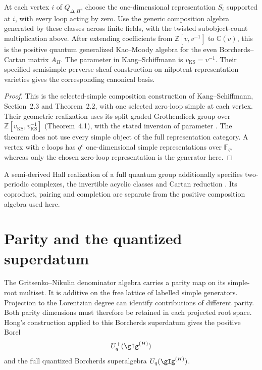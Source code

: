 \begin{theorem}
At each vertex $i$ of $Q_{\Delta,H}$, choose the one-dimensional
representation $S_i$ supported at $i$, with every loop acting by zero.
Use the generic composition algebra generated by these classes across
finite fields, with the twisted subobject-count multiplication above.
After extending coefficients from $\mathbb Z[v,v^{-1}]$ to
$\mathbb C(v)$, this is the positive quantum generalized Kac--Moody
algebra for the even Borcherds--Cartan matrix $A_H$.
The parameter in Kang--Schiffmann is $v_{\mathrm{KS}}=v^{-1}$.
Their specified semisimple perverse-sheaf construction on nilpotent
representation varieties gives the corresponding canonical basis.
\end{theorem}
\begin{proof}
This is the selected-simple composition construction of
Kang--Schiffmann, Section~2.3 and Theorem~2.2, with one selected
zero-loop simple at each vertex. Their geometric realization uses
its split graded Grothendieck group over
$\mathbb Z[v_{\mathrm{KS}},v_{\mathrm{KS}}^{-1}]$
(Theorem~4.1), with the stated inversion of parameter
\cite{KangSchiffmann}. The theorem does not use every simple object
of the full representation category. A vertex with $c$ loops has
$q^c$ one-dimensional simple representations over $\mathbb F_q$,
whereas only the chosen zero-loop representation is the generator here.
\end{proof}

A semi-derived Hall realization of a full quantum group additionally
specifies two-periodic complexes, the invertible acyclic classes and
Cartan reduction \cite{LuBorcherdsHall,AxtellLee}.
Its coproduct, pairing and completion are separate from the positive
composition algebra used here.

\section{Parity and the quantized superdatum}
The Gritsenko--Nikulin denominator algebra carries a parity map on its simple-root multiset.  It is additive on the free lattice of labelled simple generators.
Projection to the Lorentzian degree can identify contributions of
different parity. Both parity dimensions must therefore be retained
in each projected root space.  Hong's construction applied to this Borcherds superdatum gives the positive Borel
\[
 U_q^+(\gIg^{(H)})
\]
and the full quantized Borcherds superalgebra $U_q(\gIg^{(H)})$.

